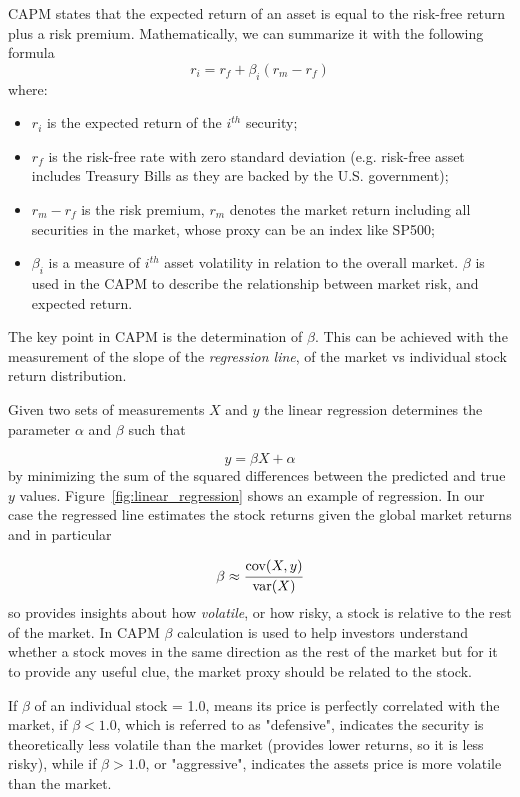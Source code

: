 CAPM states that the expected return of an asset is equal to the risk-free return plus a risk premium. 
Mathematically, we can summarize it with the following formula
\begin{equation}
r_i = r_f + \beta_i(r_m-r_f)
\label{eq:capm}
\end{equation}
where:
\begin{itemize}
	\item $r_i$ is the expected return of the $i^{th}$ security;
	\item $r_f$ is the risk-free rate with zero standard deviation (e.g. risk-free asset includes Treasury Bills as they are backed by the U.S. government);
	\item $r_m - r_f$ is the risk premium, $r_m$ denotes the market return including all securities in the market, whose proxy can be an index like SP500;
	\item $\beta_i$ is a measure of $i^{th}$ asset volatility in relation to the overall market. 
	$\beta$ is used in the CAPM to describe the relationship between market risk, and expected return.
\end{itemize}
	
The key point in CAPM is the determination of $\beta$. This can be achieved with the measurement of the slope of the \emph{regression line}, of the market vs individual stock return distribution.

Given two sets of measurements $X$ and $y$ the linear regression determines the parameter $\alpha$ and $\beta$ such that

\begin{equation}
	y=\beta X + \alpha
\end{equation}
by minimizing the sum of the squared differences between the predicted and true $y$ values.
Figure~\ref{fig:linear_regression} shows an example of regression. 
In our case the regressed line estimates the stock returns given the global market returns and in particular 

\begin{equation}
	\beta \approx \cfrac{\textrm{cov}(X,y)}{\textrm {var}(X)}
\end{equation}
so provides insights about how \emph{volatile}, or how risky, a stock is relative to the rest of the market.
In CAPM $\beta$ calculation is used to help investors understand whether a stock moves in the same direction as the rest of the market but for it to provide any useful clue, the market proxy should be related to the stock.

If $\beta$ of an individual stock = 1.0, means its price is perfectly correlated with the market, if $\beta < 1.0$, which is referred to as "defensive", indicates the security is theoretically less volatile than the market (provides lower returns, so it is less risky), while if $\beta > 1.0$, or "aggressive", indicates the assets price is more volatile than the market.

